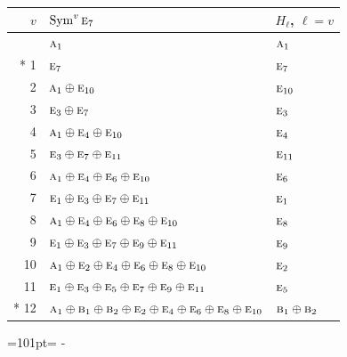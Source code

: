 \documentclass[10pt,a4paper]{article}
\newcommand{\needspace}[1]{\par\penalty-100\begingroup\dimen0=#1\relax\dimen2=\pagegoal
  \advance\dimen2-\pagetotal\ifdim\dimen0>\dimen2\relax\ifdim\dimen2>0pt\vfil\break\fi\fi
  \endgroup}
\numberwithin{equation}{section}
\newcommand{\irr}[1]{\text{\normalfont\scshape #1}}
\begin{document}
{\small\begin{longtable}{@{}rll@{}}\toprule
$v$ & $\operatorname{Sym}^{v}\irr{e}_{7}$ & $H_\ell$, $\ell = v$\\\midrule\endhead
\bottomrule\endfoot\endlastfoot
0 & $\irr{a}_{1}$ & $\irr{a}_{1}$\\*
1 & $\irr{e}_{7}$ & $\irr{e}_{7}$\\
2 & $\irr{a}_{1} \oplus \irr{e}_{10}$ & $\irr{e}_{10}$\\
3 & $\irr{e}_{3} \oplus \irr{e}_{7}$ & $\irr{e}_{3}$\\
4 & $\irr{a}_{1} \oplus \irr{e}_{4} \oplus \irr{e}_{10}$ & $\irr{e}_{4}$\\
5 & $\irr{e}_{3} \oplus \irr{e}_{7} \oplus \irr{e}_{11}$ & $\irr{e}_{11}$\\
6 & $\irr{a}_{1} \oplus \irr{e}_{4} \oplus \irr{e}_{6} \oplus \irr{e}_{10}$ & $\irr{e}_{6}$\\
7 & $\irr{e}_{1} \oplus \irr{e}_{3} \oplus \irr{e}_{7} \oplus \irr{e}_{11}$ & $\irr{e}_{1}$\\
8 & $\irr{a}_{1} \oplus \irr{e}_{4} \oplus \irr{e}_{6} \oplus \irr{e}_{8} \oplus \irr{e}_{10}$ & $\irr{e}_{8}$\\
9 & $\irr{e}_{1} \oplus \irr{e}_{3} \oplus \irr{e}_{7} \oplus \irr{e}_{9} \oplus \irr{e}_{11}$ & $\irr{e}_{9}$\\
10 & $\irr{a}_{1} \oplus \irr{e}_{2} \oplus \irr{e}_{4} \oplus \irr{e}_{6} \oplus \irr{e}_{8} \oplus \irr{e}_{10}$ & $\irr{e}_{2}$\\
11 & $\irr{e}_{1} \oplus \irr{e}_{3} \oplus \irr{e}_{5} \oplus \irr{e}_{7} \oplus \irr{e}_{9} \oplus \irr{e}_{11}$ & $\irr{e}_{5}$\\*
12 & $\irr{a}_{1} \oplus \irr{b}_{1} \oplus \irr{b}_{2} \oplus \irr{e}_{2} \oplus \irr{e}_{4} \oplus \irr{e}_{6} \oplus \irr{e}_{8} \oplus \irr{e}_{10}$ & $\irr{b}_{1} \oplus \irr{b}_{2}$\\
\bottomrule\end{longtable}}
\needspace{101pt}
\end{document}
